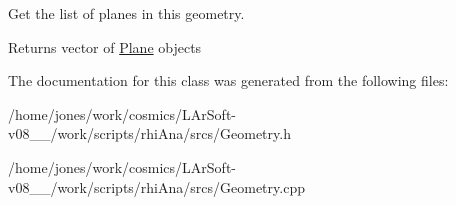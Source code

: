 Get the list of planes in this geometry. 

\begin{DoxyReturn}{Returns}
vector of \hyperlink{classcalib_1_1Plane}{Plane} objects 
\end{DoxyReturn}


The documentation for this class was generated from the following files\-:\begin{DoxyCompactItemize}
\item 
/home/jones/work/cosmics/\-L\-Ar\-Soft-\/v08\-\_\-\_/work/scripts/rhi\-Ana/srcs/Geometry.\-h\item 
/home/jones/work/cosmics/\-L\-Ar\-Soft-\/v08\-\_\-\_/work/scripts/rhi\-Ana/srcs/Geometry.\-cpp\end{DoxyCompactItemize}

